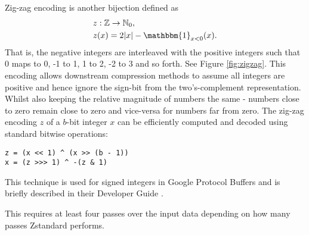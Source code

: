 Zig-zag encoding is another bijection defined as
\begin{align*}
	z&:\mathbb{Z}\to\mathbb{N}_0,\\
	z&(x)=2|x|-\mathbbm{1}_{x<0}(x).
\end{align*}
That is, the negative integers are interleaved with the positive integers such that 0 maps to 0, -1 to 1, 1 to 2, -2 to 3 and so forth.
See Figure \ref{fig:zigzag}.
This encoding allows downstream compression methods to assume all integers are positive and hence ignore the sign-bit from the two's-complement representation.
Whilst also keeping the relative magnitude of numbers the same - numbers close to zero remain close to zero and vice-versa for numbers far from zero.
The zig-zag encoding $z$ of a $b$-bit integer $x$ can be efficiently computed and decoded using standard bitwise operations:
\begin{lstlisting}
z = (x << 1) ^ (x >> (b - 1))
x = (z >>> 1) ^ -(z & 1)
\end{lstlisting}
This technique is used for signed integers in Google Protocol Buffers and is briefly described in their Developer Guide \cite{google-zigzag}.



This requires at least four passes over the input data depending on how many passes Zstandard performs.
